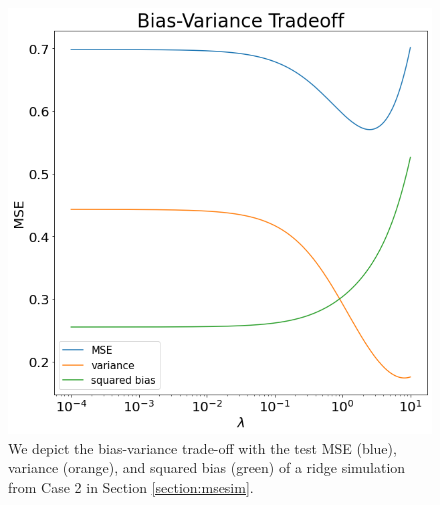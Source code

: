 \begin{figure}[H]
        \includegraphics[scale=0.45]{material/Img/bias_var_tradeoff.png}%
        \centering
        \caption[Decomposition of bias-variance trade-off]{We depict the bias-variance trade-off with the test MSE (blue), variance (orange), and squared bias (green) of a ridge simulation from Case 2 in Section \ref{section:msesim}.}
        \label{fig:bias_var}
    \end{figure}

